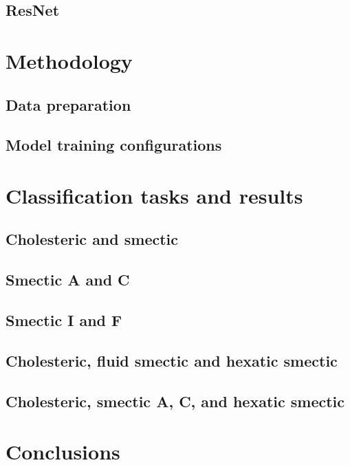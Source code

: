 \documentclass[12pt]{article}
\begin{document}
\subsection{ResNet}

\section{Methodology}

\subsection{Data preparation}

\subsection{Model training configurations}

\section{Classification tasks and results}

\subsection{Cholesteric and smectic}

\subsection{Smectic A and C}

\subsection{Smectic I and F}

\subsection{Cholesteric, fluid smectic and hexatic smectic}

\subsection{Cholesteric, smectic A, C, and hexatic smectic}

\section{Conclusions}



\appendix
\appendixpage
\end{document}
